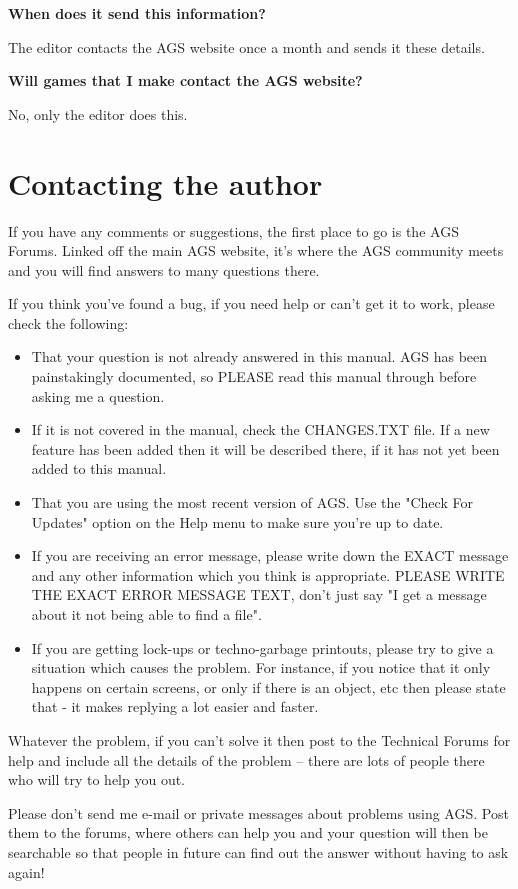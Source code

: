 \bf{When does it send this information?}

The editor contacts the AGS website once a month and sends it these details.

\bf{Will games that I make contact the AGS website?}

No, only the editor does this.



\chapter{Contacting the author}%

If you have any comments or suggestions, the first place to go is the AGS
Forums. Linked off the main AGS website, it's where the AGS community
meets and you will find answers to many questions there.

If you think you've found a bug, if you need help or can't get it to work,
please check the following:%
\begin{itemize}
\item That your question is not already answered in this manual. AGS has been
painstakingly documented, so PLEASE read this manual through before asking
me a question.
\item If it is not covered in the manual, check the CHANGES.TXT file. If a new
feature has been added then it will be described there, if it has not yet
been added to this manual.
\item That you are using the most recent version of AGS. Use the "Check For
Updates" option on the Help menu to make sure you're up to date.
\item If you are receiving an error message, please write down the EXACT message
and any other information which you think is appropriate. PLEASE WRITE THE
EXACT ERROR MESSAGE TEXT, don't just say "I get a message about it not being
able to find a file".
\item If you are getting lock-ups or techno-garbage printouts, please try to
give a situation which causes the problem. For instance, if you notice that
it only happens on certain screens, or only if there is an object, etc then
please state that - it makes replying a lot easier and faster.
\end{itemize}
Whatever the problem, if you can't solve it then post to the Technical Forums
for help and include all the details of the problem -- there are lots of
people there who will try to help you out.

Please don't send me e-mail or private messages about problems using AGS.
Post them to the forums, where others can help you and your question will
then be searchable so that people in future can find out the answer without
having to ask again!

